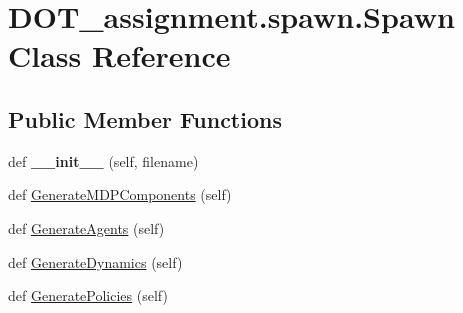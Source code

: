 \hypertarget{class_d_o_t__assignment_1_1spawn_1_1_spawn}{}\section{D\+O\+T\+\_\+assignment.\+spawn.\+Spawn Class Reference}
\label{class_d_o_t__assignment_1_1spawn_1_1_spawn}
\subsection*{Public Member Functions}
\begin{DoxyCompactItemize}
\item 
\mbox{\label{class_d_o_t__assignment_1_1spawn_1_1_spawn_a785a120c7f0d38839577532324ed3435}} 
def {\bfseries \+\_\+\+\_\+init\+\_\+\+\_\+} (self, filename)
\item 
def \mbox{\hyperlink{class_d_o_t__assignment_1_1spawn_1_1_spawn_a02b02e42f420af788e5e731c524cca78}{Generate\+M\+D\+P\+Components}} (self)
\item 
def \mbox{\hyperlink{class_d_o_t__assignment_1_1spawn_1_1_spawn_ad44b3c0812ce46e3843394ae56f0be7c}{Generate\+Agents}} (self)
\item 
def \mbox{\hyperlink{class_d_o_t__assignment_1_1spawn_1_1_spawn_a1437e91110efafc68275c8260aa44dfc}{Generate\+Dynamics}} (self)
\item 
def \mbox{\hyperlink{class_d_o_t__assignment_1_1spawn_1_1_spawn_a889cfc54fa6b539c9d393e1b5df76810}{Generate\+Policies}} (self)
\end{DoxyCompactItemize}
